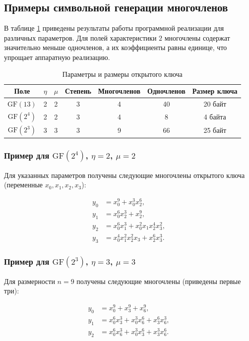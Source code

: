 \subsection{Примеры символьной генерации многочленов}

В таблице \ref{tab:examples} приведены результаты работы программной реализации для различных параметров. Для полей характеристики $2$ многочлены содержат значительно меньше одночленов, а их коэффициенты равны единице, что упрощает аппаратную реализацию.

\begin{table}[h]
\centering
\caption{Параметры и размеры открытого ключа}
\label{tab:examples}
\begin{tabular}{|c|c|c|c|c|c|c|}
\hline
Поле & $\eta$ & $\mu$ & Степень & Многочленов & Одночленов & Размер ключа \\
\hline
$\mathrm{GF}(13)$ & 2 & 2 & 3 & 4 & 40 & 20 байт \\
$\mathrm{GF}(2^4)$ & 2 & 2 & 3 & 4 & 8 & 4 байта \\
$\mathrm{GF}(2^3)$ & 3 & 3 & 3 & 9 & 66 & 25 байт \\
\hline
\end{tabular}
\end{table}

\subsubsection{Пример для $\mathrm{GF}(2^4)$, $\eta=2$, $\mu=2$}

Для указанных параметров получены следующие многочлены открытого ключа (переменные $x_0, x_1, x_2, x_3$):

\begin{align*}
y_0 &= x_0^9 + x_0^3 x_2^6,\\
y_1 &= x_0^6 x_2^3 + x_2^9,\\
y_2 &= x_0^6 x_1^3 + x_0^2 x_1 x_2^4 x_3^2,\\
y_3 &= x_0^4 x_1^2 x_2^2 x_3 + x_2^6 x_3^3.
\end{align*}

\subsubsection{Пример для $\mathrm{GF}(2^3)$, $\eta=3$, $\mu=3$}

Для размерности $n=9$ получены следующие многочлены (приведены первые три):

\begin{align*}
y_0 &= x_0^9 + x_3^9 + x_6^9,\\
y_1 &= x_0^6 x_3^3 + x_0^3 x_6^6 + x_3^6 x_6^3,\\
y_2 &= x_0^6 x_6^3 + x_0^3 x_3^6 + x_3^3 x_6^6.
\end{align*}

